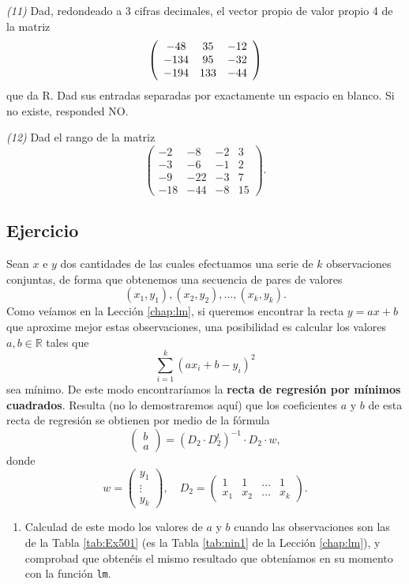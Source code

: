 \documentclass[]{book}
\providecommand{\tightlist}{%
  \setlength{\itemsep}{0pt}\setlength{\parskip}{0pt}}
\theoremstyle{definition}
\theoremstyle{definition}
\theoremstyle{definition}
\theoremstyle{remark}
\begin{document}
\emph{(11)} Dad, redondeado a 3 cifras decimales, el vector propio de valor propio 4 de la matriz
\[\left(\begin{array}{ccc}
-48 & 35 & -12\cr -134 & 95 & -32\cr -194 & 133 &-44
\end{array}
\right)\] que da R. Dad sus entradas separadas por exactamente un espacio en blanco. Si no existe, responded NO.

\emph{(12)} Dad el rango de la matriz \[\left(\begin{array}{cccc}
-2 & -8 & -2 & 3\\ -3 & -6 & -1 & 2\\ -9 &-22 & -3 & 7\\ -18 & -44 & -8 & 15
\end{array}
\right).\]

\hypertarget{ejercicio-3}{%
\subsection*{Ejercicio}\label{ejercicio-3}}

Sean \(x\) e \(y\) dos cantidades de las cuales efectuamos una serie de \(k\)
observaciones conjuntas, de forma que obtenemos una secuencia de pares de valores
\[
(x_{1}, y_{1}), (x_{2}, y_{2}), \ldots, (x_{k}, y_{k}).
\]
Como veíamos en la Lección \ref{chap:lm}, si queremos encontrar la recta \(y=ax+b\) que aproxime mejor estas observaciones, una posibilidad es calcular los valores \(a, b\in \mathbb{R}\) tales que
\[
\sum_{i=1}^k (ax_{i}+b-y_{i})^2
\]
sea mínimo. De este modo encontraríamos la \textbf{recta de regresión por mínimos cuadrados}. Resulta (no lo demostraremos aquí) que los coeficientes \(a\) y \(b\) de esta recta de regresión se obtienen por medio de la fórmula
\[
\left(\begin{matrix} b\\ a \end{matrix}
\right)=
(D_{2}\cdot D_{2}^t)^{-1}\cdot D_{2}\cdot w, 
\]
donde
\[
w=\left(\begin{matrix}y_{1}\\ \vdots\\ y_{k}\end{matrix}
\right), \quad
D_{2}=\left(\begin{matrix}
1 & 1 & \ldots & 1 \\
x_{1} & x_{2} & \ldots & x_{k}
\end{matrix}
\right).
\]

\begin{enumerate}
\def\labelenumi{\alph{enumi}.}
\tightlist
\item
  Calculad de este modo los valores de \(a\) y \(b\) cuando las observaciones son las de la Tabla \ref{tab:Ex501} (es la Tabla \ref{tab:nin1} de la Lección \ref{chap:lm}), y comprobad que obtenéis el mismo resultado que obteníamos en su momento con la función \texttt{lm}.
\end{enumerate}
\end{document}
